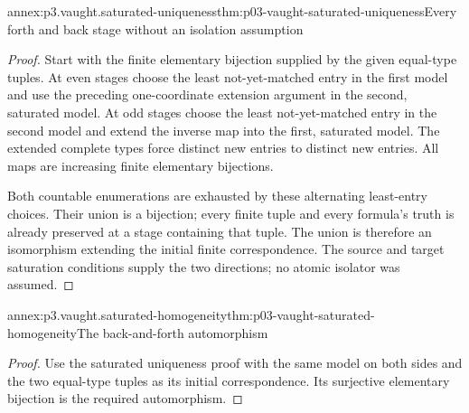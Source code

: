 \begin{annexitem}{annex:p3.vaught.saturated-uniqueness}{thm:p03-vaught-saturated-uniqueness}{Every forth and back stage without an isolation assumption}
\begin{proof}
Start with the finite elementary bijection supplied by the given
equal-type tuples. At even stages choose the least not-yet-matched
entry in the first model and use the preceding one-coordinate
extension argument in the second, saturated model.
At odd stages choose the least not-yet-matched entry in the
second model and extend the inverse map into the first,
saturated model. The extended complete types force distinct
new entries to distinct new entries. All maps are increasing
finite elementary bijections.

Both countable enumerations are exhausted by these alternating
least-entry choices. Their union is a bijection; every finite
tuple and every formula's truth is already preserved at a stage
containing that tuple. The union is therefore an isomorphism
extending the initial finite correspondence.
The source and target saturation conditions supply the two
directions; no atomic isolator was assumed.
\end{proof}
\end{annexitem}

\begin{annexitem}{annex:p3.vaught.saturated-homogeneity}{thm:p03-vaught-saturated-homogeneity}{The back-and-forth automorphism}
\begin{proof}
Use the saturated uniqueness proof with the same model on both
sides and the two equal-type tuples as its initial correspondence.
Its surjective elementary bijection is the required automorphism.
\end{proof}
\end{annexitem}

